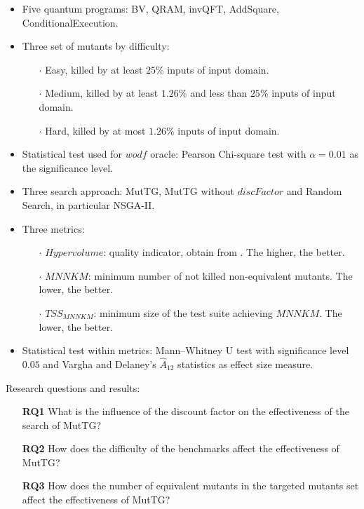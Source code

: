 \begin{itemize}
\begin{itemize}
    \item Five quantum programs: BV, QRAM, invQFT, AddSquare, ConditionalExecution.
    \item Three set of mutants by difficulty: 
        \begin{itemize}
            \item[$\cdot$] Easy, killed by at least $25\%$ inputs of input domain.
            \item[$\cdot$] Medium, killed by at least $1.26\%$ and less than $25\%$ inputs of input domain.
            \item[$\cdot$] Hard, killed by at most $1.26\%$ inputs of input domain.
        \end{itemize}
    \item Statistical test used for $wodf$ oracle: Pearson Chi-square test with $\alpha= 0.01$ as the significance level.
    \item Three search approach: MutTG, MutTG without $discFactor$ and Random Search, in particular NSGA-II.
    \item Three metrics:
        \begin{itemize}
            \item[$\cdot$] $Hypervolume$: quality indicator, obtain from \cite{shang2020survey}. The higher, the better.
            \item[$\cdot$] $MNNKM$: minimum number of not killed non-equivalent mutants. The lower, the better.
            \item[$\cdot$] $TSS_{MNNKM}$: minimum size of the test suite achieving $MNNKM$. The lower, the better.
        \end{itemize}
    \item Statistical test within metrics: Mann–Whitney U test with significance level $0.05$ and Vargha and Delaney’s $\hat{A}_{12}$ statistics as effect size measure.
\end{itemize}

Research questions and results:

\begin{itemize}
    \item[] \textbf{RQ1} What is the influence of the discount factor on the effectiveness of the search of MutTG?
    \item[] \textbf{RQ2} How does the difficulty of the benchmarks affect  the effectiveness of MutTG?
    \item[] \textbf{RQ3} How does the number of equivalent mutants in the targeted mutants set affect the effectiveness of MutTG?
\end{itemize}


\end{itemize}
